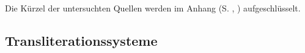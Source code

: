 \noindent{} Die Kürzel der untersuchten Quellen werden im Anhang (S. \pageref{appendixchrliji1}, \pageref{appendixjuedliji1}) %
 aufgeschlüsselt. %





\newpage
\subsection*{Transliterationssysteme}\enlargethispage{2\baselineskip}

